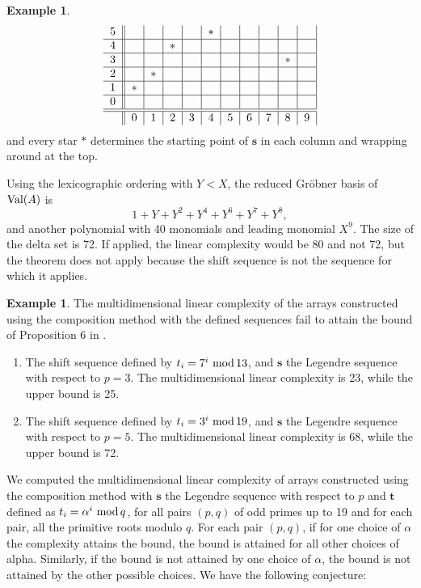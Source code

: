 \documentclass[12pt]{article}
\renewcommand{\mod}{\ \textup{mod}\,}
\newcommand{\val}{\textup{Val}}
\theoremstyle{definition}
\theoremstyle{definition}
\theoremstyle{definition}
\newtheorem{example}[theorem]{Example}
\theoremstyle{plain}
\theoremstyle{plain}
\numberwithin{equation}{section}
\begin{document}
\begin{example}
\[\begin{tabular}{c ||c|c|c|c|c|c|c|c|c|c|}
        5 & & & & & $*$ & & & & & \\\hline
        4 & & & $*$ & & & & & & & \\\hline
        3 & & & & & & & & & $*$ & \\\hline
        2 & & $*$ & & & & & & & & \\\hline
        1 & $*$ & & & & & & & & & \\\hline
        0 & & & & & & & & & & \\\hline\hline
        & 0 & 1 & 2 & 3 & 4 & 5 & 6 & 7 & 8 & 9 
        \end{tabular}
    \]
    and every star $*$ determines the starting point of $\mathbf{s}$ in each column and wrapping around at the top.
    
    Using the lexicographic ordering with $Y<X$, the reduced Gr\"obner basis of $\val(A)$ is
    \[
       1+Y+Y^2+Y^4+Y^6+Y^7+Y^8,
    \]
    and another polynomial with 40 monomials and leading monomial $X^9$. 
    The size of the delta set is 72. 
    If  applied, the linear complexity would be 80 and not 72, but the theorem does not apply because the shift sequence is not the sequence for which it applies.
\end{example}


\begin{example}
    The multidimensional linear complexity of the arrays constructed using the composition method with the defined sequences fail to attain the bound of Proposition 6 in \cite{arce2019multidimensional}.
    \begin{enumerate}
        \item The shift sequence defined by $t_i=7^i \mod 13$, and $\mathbf{s}$ the Legendre sequence with respect to $p=3$. 
        The multidimensional linear complexity is 23, while the upper bound is 25.
        
        \item The shift sequence defined by $t_i=3^i \mod 19$, and $\mathbf{s}$ the Legendre sequence with respect to $p=5$. 
        The multidimensional linear complexity is 68, while the upper bound is 72.
    \end{enumerate}
\end{example}


We computed the multidimensional linear complexity of arrays constructed using the composition method with $\mathbf{s}$ the Legendre sequence with respect to $p$ and $\mathbf{t}$ defined as $t_i = \alpha^i \mod q$, for all pairs $(p,q)$ of odd primes up to 19 and for each pair, all the primitive roots modulo $q$.  
For each pair $(p,q)$, if for one choice of $\alpha$ the complexity attains the bound, the bound is attained for all other choices of alpha. 
Similarly, if the bound is not attained by one choice of $\alpha$, the bound is not attained by the other possible choices. 
We have the following conjecture:
\end{document}

